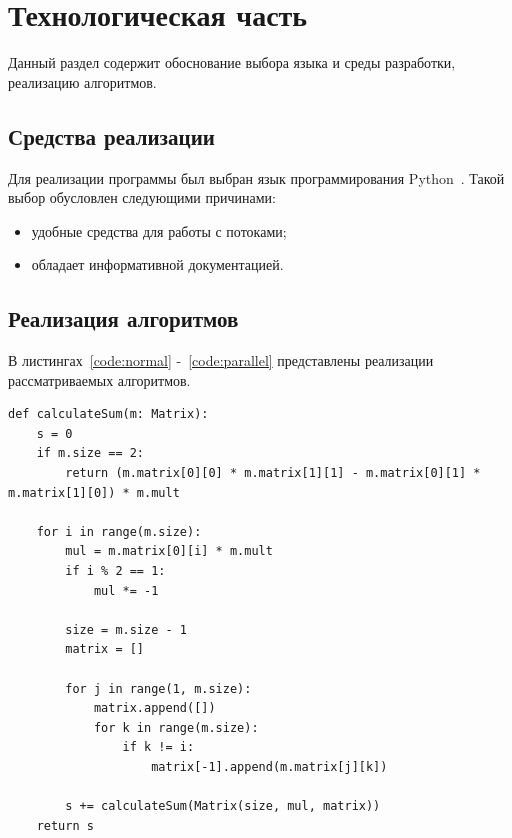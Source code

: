 \documentclass[12pt]{report}
\begin{document}
    \chapter{Технологическая часть}
    Данный раздел содержит обоснование выбора языка и среды разработки, реализацию алгоритмов.


    \section{Средства реализации}
    Для реализации программы был выбран язык программирования Python~\cite{Python}.
    Такой выбор обусловлен следующими причинами:
    \begin{itemize}
        \item удобные средства для работы с потоками;
        \item обладает информативной документацией.
    \end{itemize}


    \section{Реализация алгоритмов}
    В листингах~\ref{code:normal} -~\ref{code:parallel} представлены
    реализации рассматриваемых алгоритмов.

    \begin{lstlisting}[caption=Рекурсивный алгоритм, label={code:normal}]
        def calculateSum(m: Matrix):
    s = 0
    if m.size == 2:
        return (m.matrix[0][0] * m.matrix[1][1] - m.matrix[0][1] * m.matrix[1][0]) * m.mult

    for i in range(m.size):
        mul = m.matrix[0][i] * m.mult
        if i % 2 == 1:
            mul *= -1

        size = m.size - 1
        matrix = []

        for j in range(1, m.size):
            matrix.append([])
            for k in range(m.size):
                if k != i:
                    matrix[-1].append(m.matrix[j][k])

        s += calculateSum(Matrix(size, mul, matrix))
    return s
    \end{lstlisting}
\end{document}
